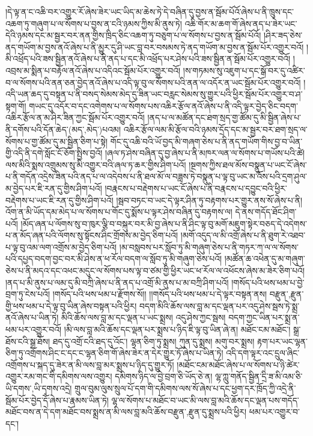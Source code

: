 །དེ་ལྟ་ན་ང་འཆི་བར་འགྱུར་རོ་ཞེས་ཟེར་ཡང་ཡིད་མ་ཆེས་ཏེ་དེ་བཞིན་དུ་བྱས་ན་སྦོམ་པོའོ་ཞེས་པ་ནི་ཁྲུས་དང་འཆག་ཏུ་གཞུག་པ་ལ་སོགས་པ་བྱས་ན་ངའི་ཉམས་ཀྱིས་མི་ནུས་ཏེ། འཆི་གོར་མ་ཆག་གོ་ཞེས་ནད་པ་ཟེར་ཡང་དེའི་ཉམས་དང་མ་སྦྱར་བར་ནན་གྱིས་ཁྲིད་ཅིང་འཆག་ཏུ་བཅུག་པ་ལ་སོགས་པ་བྱས་ན་སྦོམ་པོའོ། །ཤིར་ཟད་ཅེས་ནད་གཡོག་མ་བྱས་ནའོ་ཞེས་པ་ནི་མྱུར་དུ་ཤི་ཡང་བླ་བར་བསམས་ཏེ་ནད་གཡོག་མ་བྱས་ན་སྦོམ་པོར་འགྱུར་བའོ། །མི་འཕྲོད་པའི་ཟས་སྦྱིན་ནའོ་ཞེས་པ་ནི་ནད་པ་དང་མི་འཕྲོད་པར་ཤེས་པའི་ཟས་སྦྱིན་ན་སྦོམ་པོར་འགྱུར་བའོ། །འབྲས་མ་སྨིན་པ་བརྟོལ་ནའོ་ཞེས་པ་འདིའང་སྦོམ་པོར་འགྱུར་བའོ། །ས་གཏམས་སུ་འཇུག་པ་དང་སྒོ་བར་དུ་འཚིར་བ་ལ་སོགས་པའི་ནན་ཅན་བྱེད་ནའོ་ཞེས་པ་འདི་ལྟ་བུ་ལ་སོགས་པའི་ནན་ལ་འདོར་ན་ཡང་སྦོམ་པོར་འགྱུར་བའོ། །འདི་ཡན་ཆད་དུ་བསྟན་པ་ནི་བསད་སེམས་མེད་དུ་ཟིན་ཡང་བརླང་སེམས་སུ་གྱུར་པའི་ཕྱིར་སྦོམ་པོར་འགྱུར་བ་ཤ་སྟག་གོ། གཡང་དུ་འདོར་བ་དང་འགེགས་པ་ལ་སོགས་པས་འཆིར་རྩོལ་ནའོ་ཞེས་པ་ནི་འདི་ལྟར་བྱེད་ཅིང་བདག་འཆིར་རྩོལ་ན་མ་ཤིར་ཟིན་ཀྱང་སྦོམ་པོར་འགྱུར་བའོ། །ནད་པ་ལ་མཚོན་དང་ཐག་སྲད་གྱ་ཚོམ་དུ་མི་སྦྱིན་ཞེས་པ་ནི་དགོས་པའི་དོན་ཆེད་(མད་‚མེད་)པའམ། འཆིར་རྩོལ་ལམ་མི་རྩོལ་བའི་ཉམས་དྲོད་དང་མ་སྦྱར་བར་ཐག་སྲད་ལ་སོགས་པ་གྱ་ཚོམ་དུ་མ་སྦྱིན་ཅིག་པ་སྟེ། གོང་དུ་འཆི་བའི་ཡོ་བྱད་མི་གཞག་ཅེས་པ་ནི་ནད་གཡོག་གིས་བྱ་བ་ཡིན་གྱི་འདི་ནི་དགེ་སློང་ངོ་ཅོག་སྤྱིས་བྱའོ། །ཞལ་ཏ་ཤེས་བཞིན་དུ་བྱ་ཞེས་པ་ནི་མཁར་ལན་ལ་སོགས་པ་གཡོས་པའི་ཚེ། ལས་མིའི་སྨས་འགྲུམས་སུ་མི་འགྱུར་བའི་ཞལ་ཏ་ཆར་གྱིས་ཤིག་པའོ། །སྔགས་ཀྱིས་ཐལ་མོས་བསྣུན་པ་ཡང་ངོ་ཞེས་པ་ནི་གདོན་འདྲེས་ཟིན་པའི་ནད་པ་ལ་འདེབས་པ་ནི་ཐལ་མོ་ལ་བཟླས་ཏེ་བསྣུན་པ་ལྟ་བུ་ཡང་མ་འོས་པའི་དྲག་ཤུལ་མ་བྱེད་པར་ཇི་རན་དུ་གྱིས་ཤིག་པའོ། །བརྣངས་པ་བརྡེགས་པ་ཡང་ངོ་ཞེས་པ་ནི་བརྣངས་པ་དབྱུང་བའི་ཕྱིར་བརྡེགས་པ་ཡང་ཇི་རན་དུ་གྱིས་ཤིག་པའོ། །སྦབ་བཏང་བ་ཡང་དེ་ལྟར་ཤིན་ཏུ་བརྟགས་པར་གྱུར་ནས་སོ་ཞེས་པ་ནི། འོག་ན་མི་ཡོད་དམ་མེད་པ་ལ་སོགས་པ་གོང་དུ་སྨོས་པ་ལྟར་ཤེས་བཞིན་དུ་བརྟགས་ལ། དེ་ནས་གདོད་ཐོང་ཤིག་པའོ། །མོད་ཞན་པ་ལོགས་སུ་བ་ཁུར་ལྕི་བ་བསྐུར་བར་མི་བྱ་ཞེས་པ་ནི་ཤིང་ལྟ་བུ་མགོ་མཇུག་སྟེར་བཅད་དེ་འདེགས་པ་ན་མོད་ཞན་པའི་ལོགས་སུ་སྟོངས་ཤིང་གྲོགས་མ་བྱེད་ཅིག་པའོ། །མགོ་འདུད་ལ་མི་འགྲོ་ཞེས་པ་ནི་ཐུག་རེ་འཐབ་པ་ལྟ་བུ་འམ་ལག་འགྲོས་མ་བྱེད་ཅིག་པའོ། །མ་བསླབས་པར་སློབ་ཏུ་མི་གཞུག་ཅེས་པ་ནི་གཏར་ཀ་ལ་ལ་སོགས་པའི་དཔྱད་བདག་བྱང་བར་མི་ཤེས་ན་ཕ་རོལ་བདག་ལ་སློབ་ཏུ་མི་གཞུག་ཅེས་པའོ། །མཚོན་ཆ་འཕེན་དུ་མ་གཞུག་ཅེས་པ་ནི་མདའ་དང་འཕང་མདུང་ལ་སོགས་པས་ལྟ་བ་ཙམ་གྱི་ཕྱིར་ཡང་ཕ་རོལ་ལ་འཕོངས་ཞེས་མ་ཟེར་ཅིག་པའོ། །ནད་པ་མི་ནུས་པ་ལམ་དུ་མི་བཀྲི་ཞེས་པ་ནི་ནད་པ་འགྲོ་མི་ནུས་པ་མ་བཀྲི་ཤིག་པའོ། །གསོད་པའི་ཕས་ཕམ་པ་བྱེ་བྲག་ཏུ་ངེས་པའོ། །གསོད་པའི་ཕས་ཕམ་པ་རྫོགས་སོ།། །།གསོད་པའི་ཕས་ཕམ་པ་དེ་ལྟར་བསྟན་ནས། {བརྫུན་,རྫུན་}གྱི་ཕས་ཕམ་པ་དེ་ལྟ་བུ་ཡིན་ཞེས་བསྟན་པའི་ཕྱིར། བདག་མིའི་ཆོས་ལས་བླ་མ་དང་ལྡན་པར་འདུ་ཤེས་སྦས་ཏེ་སྨྲ་ནའོ་ཞེས་པ་ཡིན་ཏེ། མིའི་ཆོས་ལས་བླ་མ་དང་ལྡན་པ་ཡང་སྨྲས། འདུ་ཤེས་ཀྱང་སྦས། བདག་ཀྱང་ཡིན་པར་སྨྲ་ན་ཕམ་པར་འགྱུར་བའོ། །མི་ལས་བླ་མའི་ཆོས་དང་ལྡན་པར་སྨྲས་པ་ཉིད་ཇི་ལྟ་བུ་ཡིན་ཞེ་ན། མཐོང་ངམ་མཐོང་། སྒྲ་ཐོས་ངའི་སྒྲ་ཐོས། ཐད་དུ་འགྲོ་ངའི་ཐད་དུ་འོང་། ལྷན་ཅིག་ཏུ་སྨྲས། ཀུན་དུ་སྨྲས། མགུ་བར་སྨྲས། རྟག་པར་ཡང་ལྷན་ཅིག་ཏུ་འགྲོགས་ཤིང་ང་དང་ང་ལྷན་ཅིག་གོ་ཞེས་ཟེར་ན་དེར་གྱུར་ཏོ་ཞེས་པ་ཡིན་ཏེ། འདི་དག་ལྟར་འང་དྲུལ་ཞིང་འགྲོགས་པ་སྐད་དུ་ཟེར་ན་མི་ལས་བླ་མར་སྨྲས་པ་ཉིད་དུ་གྱུར་ཏོ། །མཐོང་ངམ་མཐོང་ཞེས་པ་ལ་སོགས་པ་ཉི་ཚེར་འགྱུར་རམ་གང་གི་དམིགས་ལས་འགྱུར། དམིགས་ཉིད་ལ་བྱེ་བྲག་ཅི་ཡོད་ཅེ་ན། ལྷ་ཀླུ་གནོད་སྦྱིན་དྲི་ཟ་མི་འམ་ཅི་{ཡི་དགས་,ཡི་དྭགས་}འདྲེ། གྲུལ་བུམ་ལུས་སྲུལ་པོ་དག་གི་དམིགས་ལས་སོ་ཞེས་པ་དང་ཕྱག་དར་ཁྲོད་ཀྱི་འདྲེ་ནི་སྦོམ་པོར་བྱེད་དོ་ཞེས་པ་རྣམས་ཡིན་ཏེ། ལྷ་ལ་སོགས་པ་མཐོང་བ་ཡང་མི་ལས་བླ་མའི་ཆོས་དང་ལྡན་པས་གདོད་མཐོང་བས་ན་དེ་དག་མཐོང་བས་སྨྲས་ན་མི་ལས་བླ་མའི་ཆོས་{བརྫུན་,རྫུན་}དུ་སྨྲས་པའི་ཕྱིར། ཕམ་པར་འགྱུར་བ་དང་། 